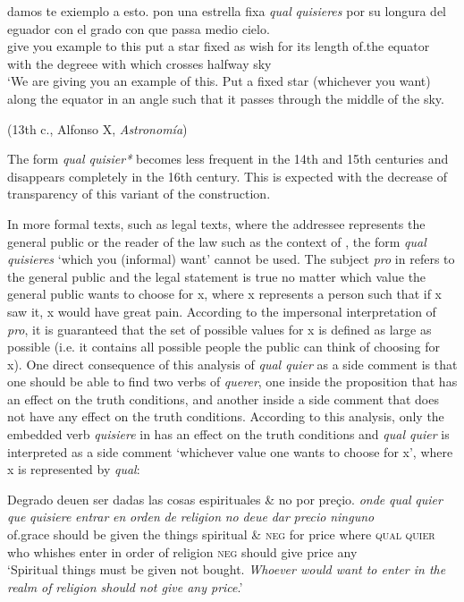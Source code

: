\ea \label{ex:key:312} %
  \gll damos te exiemplo a esto. pon una estrella fixa \textit{qual} \textit{quisieres} por su longura del eguador con el grado con que passa medio cielo.\\
give you example to this put a star fixed as wish for its length of.the equator with the degreee with which crosses halfway sky\\
  \glt ‘We are giving you an example of this. Put a fixed star (whichever you want) along the equator in an angle such that it passes through the middle of the sky.

{  (13th c., Alfonso X,} {\textit{Astronomía}}{)}
\z

The form \textit{qual quisier*} becomes less frequent in the 14th and 15th centuries and disappears completely in the 16th century. This is expected with the decrease of transparency of this variant of the construction.

In more formal texts, such as legal texts, where the addressee represents the general public or the reader of the law such as the context of , the form \textit{qual quisieres} ‘which you (informal) want’ cannot be used. The subject \textit{pro} in  refers to the general public and the legal statement is true no matter which value the general public wants to choose for x, where x represents a person such that if x saw it, x would have great pain. According to the impersonal interpretation of \textit{pro}, it is guaranteed that the set of possible values for x is defined as large as possible (i.e. it contains all possible people the public can think of choosing for x). One direct consequence of this analysis of \textit{qual quier} as a side comment is that one should be able to find two verbs of \textit{querer}, one inside the proposition that has an effect on the truth conditions, and another inside a side comment that does not have any effect on the truth conditions. According to this analysis, only the embedded verb \textit{quisiere} in  has an effect on the truth conditions and \textit{qual quier} is interpreted as a side comment ‘whichever value one wants to choose for x’, where x is represented by \textit{qual}:

\ea \label{ex:key:313} %
  \gll Degrado deuen ser dadas las cosas espirituales \& no por preçio. \textit{onde} \textit{qual} \textit{quier} \textit{que} \textit{quisiere} \textit{entrar} \textit{en} \textit{orden} \textit{de} \textit{religion} \textit{no} \textit{deue} \textit{dar} \textit{precio} \textit{ninguno}\\
of.grace should be given the things spiritual \& \textsc{neg} for price where \textsc{qual} \textsc{quier} who whishes enter in order of religion \textsc{neg} should give price any\\
  \glt ‘Spiritual things must be given not bought. \textit{Whoever would want to enter in the realm of} \textit{religion should not give any price}.’

